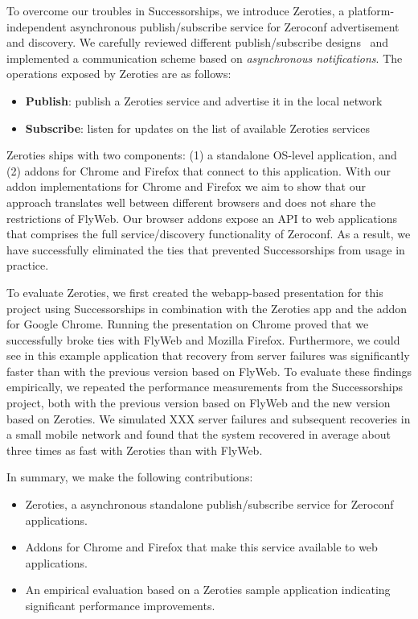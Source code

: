 To overcome our troubles in Successorships, we introduce Zeroties, a platform-independent asynchronous publish/subscribe service for Zeroconf advertisement and discovery.
We carefully reviewed different publish/subscribe designs~\cite{eugster_2003} and implemented a communication scheme based on \textit{asynchronous notifications}.
The operations exposed by Zeroties are as follows:
\begin{itemize}
    \item \textbf{Publish}: publish a Zeroties service and advertise it in the local network
    \item \textbf{Subscribe}: listen for updates on the list of available Zeroties services
\end{itemize}

Zeroties ships with two components: (1) a standalone OS-level application, and (2) addons for Chrome and Firefox that connect to this application.
With our addon implementations for Chrome and Firefox we aim to show that our approach translates well between different browsers and does not share the restrictions of FlyWeb.
Our browser addons expose an API to web applications that comprises the full service/discovery functionality of Zeroconf.
As a result, we have successfully eliminated the ties that prevented Successorships from usage in practice.

To evaluate Zeroties, we first created the webapp-based presentation for this project using Successorships in combination with the Zeroties app and the addon for Google Chrome.
Running the presentation on Chrome proved that we successfully broke ties with FlyWeb and Mozilla Firefox.
Furthermore, we could see in this example application that recovery from server failures was significantly faster than with the previous version based on FlyWeb.
To evaluate these findings empirically, we repeated the performance measurements from the Successorships project, both with the previous version based on FlyWeb and the new version based on Zeroties.
We simulated XXX server failures and subsequent recoveries in a small mobile network and found that the system recovered in average about three times as fast with Zeroties than with FlyWeb.

In summary, we make the following contributions:
\begin{itemize}
    \item Zeroties, a asynchronous standalone publish/subscribe service for Zeroconf applications.
    \item Addons for Chrome and Firefox that make this service available to web applications.
    \item An empirical evaluation based on a Zeroties sample application indicating significant performance improvements.
\end{itemize}

